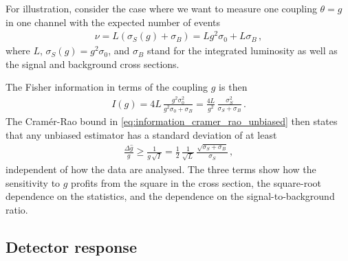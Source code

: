 For illustration, consider the case where we want to measure one
coupling $\theta = g$ in one channel with the expected number of
events
%
\begin{align}
  \nu = L \left( \sigma_S(g) + \sigma_B \right) 
        = L g^2 \sigma_0 + L \sigma_B \,,
\end{align}
%
where $L$, $\sigma_S(g) = g^2 \sigma_0$, and $\sigma_B$
stand for the integrated luminosity as well as the signal and background
cross sections.

The Fisher information in terms of the coupling $g$ is then
%
\begin{align}
  I(g) = 4 L \, \frac {g^2 \sigma_0^2 } {g^2 \sigma_0 + \sigma_B} 
         = \frac{4 L}{g^2} \, \frac {\sigma_S^2 } {\sigma_S + \sigma_B} \, .
\end{align}
%
The Cram\'er-Rao bound in \autoref{eq:information_cramer_rao_unbiased}
then states that any unbiased estimator has a standard deviation of at
least
%
\begin{align}
\frac{\Delta \hat{g}}{g} \geq \frac 1 {g \, \sqrt{I}} = 
\frac{1}{2} \, \frac 1 {\sqrt{L}} \, \frac {\sqrt{\sigma_S +\sigma_B}} {\sigma_S} \,,
\end{align}
%
independent of how the data are analysed. The three terms show how the
sensitivity to $g$ profits from the square in the cross section, the
square-root dependence on the statistics, and the dependence on the
signal-to-background ratio.


\subsection{Detector response}
\label{sec:appendix_information_smearing}

